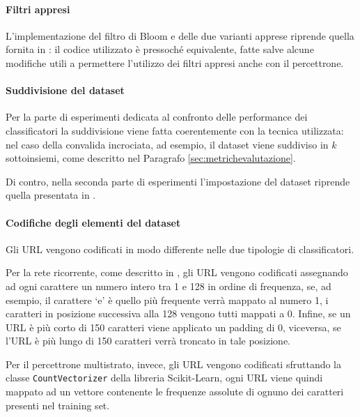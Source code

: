 \documentclass[../../main.tex]{subfiles}
\begin{document}
    \paragraph{Filtri appresi}
    L'implementazione del filtro di Bloom e delle due varianti apprese riprende quella fornita in \cite{ma2020}: il codice utilizzato è pressoché equivalente, fatte salve alcune modifiche utili a permettere l'utilizzo dei filtri appresi anche con il percettrone.

    \paragraph{Suddivisione del dataset}
    Per la parte di esperimenti dedicata al confronto delle performance dei classificatori la suddivisione viene fatta coerentemente con la tecnica utilizzata: nel caso della convalida incrociata, ad esempio, il dataset viene suddiviso in $k$ sottoinsiemi, come descritto nel Paragrafo \ref{sec:metrichevalutazione}.

    Di contro, nella seconda parte di esperimenti l'impostazione del dataset riprende quella presentata in \cite{ma2020}.

    \paragraph{Codifiche degli elementi del dataset}
    Gli URL vengono codificati in modo differente nelle due tipologie di classificatori.

    Per la rete ricorrente, come descritto in \cite{ma2020}, gli URL vengono codificati assegnando ad ogni carattere un numero intero tra 1 e 128 in ordine di frequenza, se, ad esempio, il carattere `e' è quello più frequente verrà mappato al numero 1, i caratteri in posizione successiva alla 128 vengono tutti mappati a 0. Infine, se un URL è più corto di 150 caratteri viene applicato un padding di 0, viceversa, se l'URL è più lungo di 150 caratteri verrà troncato in tale posizione.

    Per il percettrone multistrato, invece, gli URL vengono codificati sfruttando la classe \texttt{CountVectorizer} della libreria Scikit-Learn, ogni URL viene quindi mappato ad un vettore contenente le frequenze assolute di ognuno dei caratteri presenti nel training set.
\end{document}
